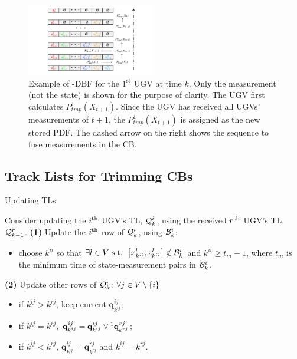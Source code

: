 	\begin{figure}%
		\centering
		\includegraphics[width=0.50\textwidth]{figures/fifo-dbf}
		\caption{Example of \proto-DBF for the $1^\text{st}$ UGV at time $k$. 
			Only the measurement (not the state) is shown for the purpose of clarity.
			The UGV first calculates $ P^1_{tmp}(X_{t+1})$. 
			Since the UGV has received all UGVs' measurements of $t+1$, the $ P^1_{tmp}(X_{t+1})$ is assigned as the new stored PDF. 
			The dashed arrow on the right shows the sequence to fuse measurements in the CB.}
		\label{fig:LIFO-DBF}
	\end{figure}			
	
	\subsection{Track Lists for Trimming CBs}\label{subsec:tracklist}
	
	\begin{algorithm}
		\caption{Updating TLs}
		\label{alg:upd_tl}
		\begin{algorithmic}
			\State Consider updating the $i^\text{th}$ UGV's TL, $\mathcal{Q}^i_k$, using the received $r^\text{th}$ UGV's TL, $\mathcal{Q}^r_{k-1}$.		
			\State \textbf{(1)} Update the $i^\text{th}$ row of $\mathcal{Q}^i_k$, using $\mathcal{B}^i_k$:
			\begin{itemize}
				\item choose $k^{ii}$ so that $\exists l\in V \text{ s.t. } \left[x^l_{k^{ii}},z^l_{k^{ii}}\right]\notin \mathcal{B}^i_k$ and $k^{ii} \ge t_m-1$, where $t_m$ is the minimum time of state-measurement pairs in $\mathcal{B}^i_k$.
			\end{itemize}
			\State \textbf{(2)} Update other rows of $\mathcal{Q}^i_k$:
			$\forall j\in V\setminus\left\lbrace i\right\rbrace$
			\begin{itemize} 
				\item if $k^{ij}>k^{rj}$, keep current $\mathbf{q}^{ij}_{k^{ij}}$;
				\item if $k^{ij}=k^{rj}$, $\mathbf{q}^{ij}_{k^{ij}}=\mathbf{q}^{ij}_{k^{ij}} \lor\footnotemark\mathbf{q}^{rj}_{k^{rj}}$; 
				\item if $k^{ij}<k^{rj}$, $\mathbf{q}^{ij}_{k^{ij}}=\mathbf{q}^{rj}_{k^{rj}}$ and $k^{ij}=k^{rj}$.
			\end{itemize}
		\end{algorithmic}
	\end{algorithm}
	
